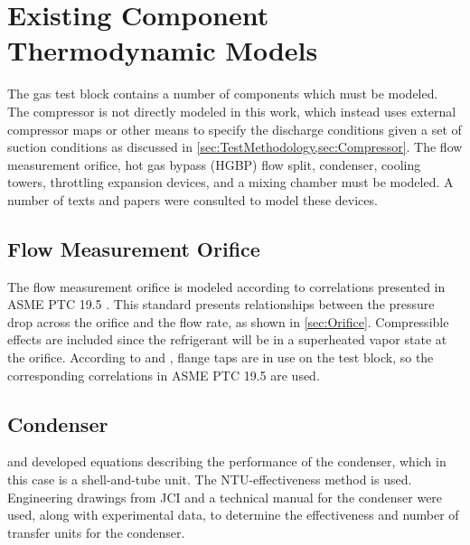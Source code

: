 
\section{Existing Component Thermodynamic Models}
The  gas test block contains a number of components which must be modeled. 
The compressor is not directly modeled in this work, 
which instead uses external compressor maps or other means 
to specify the discharge conditions given a set of suction conditions
as discussed in \cref{sec:TestMethodology,sec:Compressor}. 
The flow measurement orifice, hot gas bypass (HGBP)%
 flow split, condenser, cooling towers, 
throttling expansion devices, and a mixing chamber must be modeled. 
A number of texts and papers were consulted to model these devices.

\subsection{Flow Measurement Orifice}
The flow measurement orifice is modeled according to correlations presented in 
ASME PTC 19.5 \citep{ptc19}. 
This standard presents relationships between 
the pressure drop across the orifice and the flow rate, as shown in \cref{sec:Orifice}. 
Compressible effects are included since the refrigerant will be in a 
superheated vapor state at the orifice.
According to \citet{trevino2012} and \citet{flow1984}, flange taps
are in use on the test block, so the corresponding correlations in ASME PTC 19.5
are used.

\subsection{Condenser}
\citet{incropera2007} and \citet{incropera1985} developed equations describing the 
performance of the condenser, which in this case is a shell-and-tube unit. 
The NTU-effectiveness method is used. 
Engineering drawings from JCI \citep{cond1983} and a technical manual
for the condenser \citep{condman} were used, along with experimental data,
to determine the effectiveness and number of transfer units for the condenser.


